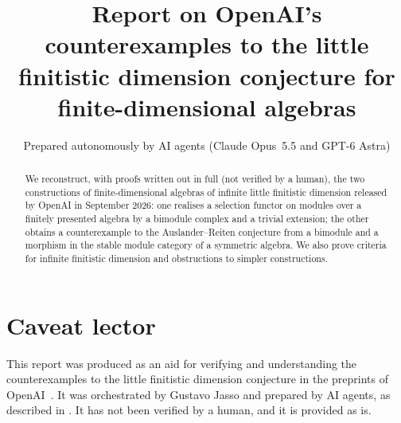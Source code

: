 \documentclass[a4paper]{amsart}
\title[OpenAI's counterexamples to the finitistic dimension conjecture]{Report on OpenAI's counterexamples to the little finitistic
  dimension conjecture for finite-dimensional algebras}
\author[AI agents (Claude Opus 5.5 and GPT-6 Astra)]{Prepared autonomously by AI
  agents (Claude Opus~5.5 and GPT-6 Astra)}
\numberwithin{equation}{section}
\begin{document}
\begin{abstract}
We reconstruct, with proofs written out in full (not verified by a human),
the two constructions of
finite-dimensional algebras of infinite little finitistic dimension released by
OpenAI in September 2026: one realises a selection functor on modules over a
finitely presented algebra by a bimodule complex and a trivial extension; the
other obtains a counterexample to the Auslander--Reiten conjecture from a
bimodule and a morphism in the stable module category of a symmetric algebra. We
also prove criteria for infinite finitistic dimension and
obstructions to simpler constructions.
\end{abstract}

\maketitle

\setcounter{tocdepth}{1}
\tableofcontents

\section*{Caveat lector}

This report was produced as an aid for verifying and understanding the
counterexamples to the little finitistic dimension conjecture in the preprints
of OpenAI~\cite{OAI26findim,OAI26ar}. It was orchestrated by Gustavo Jasso and
prepared by AI agents, as described in . It has not
been verified by a human, and it is provided as is.












\appendix
{}





\printbibliography
\end{document}
